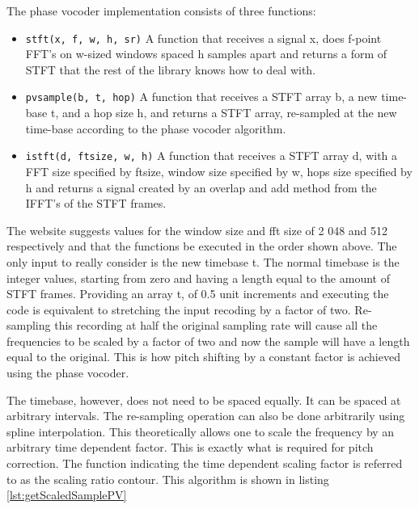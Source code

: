 \vspace{1cm}
The phase vocoder implementation consists of three functions:
\vspace{-1cm}
\begin{itemize}
\item\colorbox{backcolour}{\lstinline{stft(x, f, w, h, sr)}}\newline
A function that receives a signal x, does f-point FFT's on w-sized windows spaced
h samples apart and returns a form of STFT that the rest of the library knows how
to deal with.
\item\colorbox{backcolour}{\lstinline{pvsample(b, t, hop)}}\newline
A function that receives a STFT array b, a new time-base t, and a hop size h,
and returns a STFT array, re-sampled at the new time-base according to the phase
vocoder algorithm.
\item\colorbox{backcolour}{\lstinline{istft(d, ftsize, w, h)}}\newline
A function that receives a STFT array d, with a FFT size specified by ftsize,
window size specified by w, hops size specified by h and returns a signal created
by an overlap and add method from the IFFT's of the STFT frames.
\end{itemize}

The website suggests values for the window size and fft size of 2 048 and 512
respectively and that the functions be executed in the order shown above. The only
input to really consider is the new timebase t. The normal timebase is the
integer values, starting from zero and having a length equal to the amount of STFT
frames. Providing an array t, of 0.5 unit increments and executing the code is
equivalent to stretching the input recoding by a factor of two. Re-sampling this
recording at half the original sampling rate will cause all the frequencies to be
scaled by a factor of two and now the sample will have a length equal to the
original. This is how pitch shifting by a constant factor is achieved using the
phase vocoder.

The timebase, however, does not need to be spaced equally. It can be spaced at
arbitrary intervals. The re-sampling operation can also be done arbitrarily using
spline interpolation. This theoretically allows one to scale the frequency by an
arbitrary time dependent factor. This is exactly what is required for pitch
correction. The function indicating the time dependent scaling factor is referred
to as the scaling ratio contour. This algorithm is shown in listing
\ref{lst:getScaledSamplePV}


